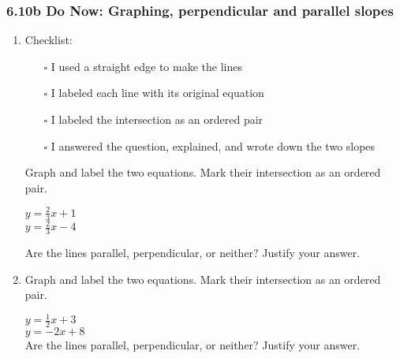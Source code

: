 \documentclass[12pt, twoside]{article}
\begin{document}
\subsubsection*{6.10b Do Now: Graphing, perpendicular and parallel slopes}
  \begin{enumerate}

  \item Checklist:
  \begin{itemize}
    \item[$\square$]   I used a straight edge to make the lines
    \item[$\square$]   I labeled each line with its original equation
    \item[$\square$]   I labeled the intersection as an ordered pair
    \item[$\square$]   I answered the question, explained, and wrote down the two slopes
  \end{itemize}
  Graph and label the two equations. Mark their intersection as an ordered pair.
    \begin{multicols}{2}
      $y =\frac{2}{3}x+1$ \\
      $y=\frac{2}{3}x-4$
    \end{multicols}     \vspace{0.1cm}
    Are the lines parallel, perpendicular, or neither? Justify your answer.
    \vspace{2.5cm}

    \begin{center} %
    \end{center}

\newpage
  \item Graph and label the two equations. Mark their intersection as an ordered pair.
      \begin{multicols}{2}
        $y =\frac{1}{2}x+3$ \\[0.25cm]
        $y=-2x+8$ \\
        Are the lines parallel, perpendicular, or neither? Justify your answer.
      \end{multicols}     \vspace{0.1cm}
      \vspace{1cm}


\end{enumerate}
\end{document}

